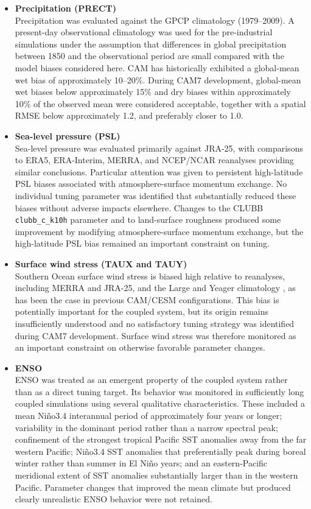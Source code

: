 \documentclass[draft]{agujournal2019}
\begin{document}
\begin{itemize}
 \item \textbf{Precipitation (PRECT)} \\
 Precipitation was evaluated against the GPCP climatology (1979--2009). A present-day observational climatology was used for the pre-industrial simulations under the assumption that differences in global precipitation between 1850 and the observational period are small compared with the model biases considered here. CAM has historically exhibited a global-mean wet bias of approximately 10--20\%. During CAM7 development, global-mean wet biases below approximately 15\% and dry biases within approximately 10\% of the observed mean were considered acceptable, together with a spatial RMSE below approximately 1.2, and preferably closer to 1.0. 
 
 \item \textbf{Sea-level pressure (PSL)} \\
 Sea-level pressure was evaluated primarily against JRA-25, with comparisons to ERA5, ERA-Interim, MERRA, and NCEP/NCAR reanalyses providing similar conclusions. Particular attention was given to persistent high-latitude PSL biases associated with atmosphere-surface momentum exchange. No individual tuning parameter was identified that substantially reduced these biases without adverse impacts elsewhere. Changes to the CLUBB \texttt{clubb\_c\_k10h} parameter and to land-surface roughness produced some improvement by modifying atmosphere-surface momentum exchange, but the high-latitude PSL bias remained an important constraint on tuning. 
 
 \item \textbf{Surface wind stress (TAUX and TAUY)} \\
 Southern Ocean surface wind stress is biased high relative to reanalyses, including MERRA and JRA-25, and the Large and Yeager climatology \cite{LargeYeager2009}, as has been the case in previous CAM/CESM configurations. This bias is potentially important for the coupled system, but its origin remains insufficiently understood and no satisfactory tuning strategy was identified during CAM7 development. Surface wind stress was therefore monitored as an important constraint on otherwise favorable parameter changes. 
 
 \item \textbf{ENSO} \\
 ENSO was treated as an emergent property of the coupled system rather than as a direct tuning target. Its behavior was monitored in sufficiently long coupled simulations using several qualitative characteristics. These included a mean Ni\~no3.4 interannual period of approximately four years or longer; variability in the dominant period rather than a narrow spectral peak; confinement of the strongest tropical Pacific SST anomalies away from the far western Pacific; Ni\~no3.4 SST anomalies that preferentially peak during boreal winter rather than summer in El Ni\~no years; and an eastern-Pacific meridional extent of SST anomalies substantially larger than in the western Pacific. Parameter changes that improved the mean climate but produced clearly unrealistic ENSO behavior were not retained.
\end{itemize}
 
\end{document}
